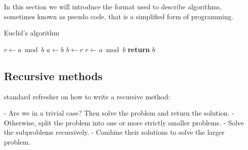 \myindent In this section we will introduce the format used to describe algorithms, sometimes known as pseudo code, that is a simplified form of programming. 

\begin{algorithm}
    \caption{Euclid’s algorithm}
    \label{euclid}
    \begin{algorithmic}[1] %
         
            \State $r\gets a \bmod b$
             
                \State $a \gets b$
                \State $b \gets r$
                \State $r \gets a \bmod b$
            \EndWhile\label{euclidendwhile}
            \State \textbf{return} $b$
        \EndProcedure
    \end{algorithmic}
\end{algorithm}

\subsection{Recursive methods}
standard refresher on how to write a recursive method:

- Are we in a trivial case? Then solve the problem and return the solution.
- Otherwise, split the problem into one or more strictly smaller problems.
- Solve the subproblems recursively.
- Combine their solutions to solve the larger problem.
